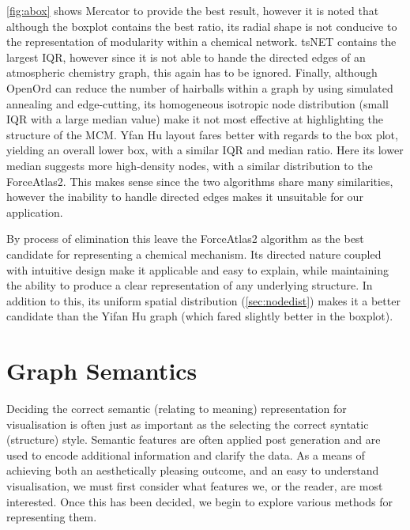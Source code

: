 \autoref{fig:abox} shows Mercator to provide the best result, however it is noted that although the boxplot contains the best ratio, its radial shape is not conducive to the representation of modularity within a chemical network. tsNET contains the largest IQR, however since it is not able to hande the directed edges of an atmospheric chemistry graph, this again has to be ignored. Finally, although OpenOrd can reduce the number of hairballs within a graph by using simulated annealing and edge-cutting, its homogeneous isotropic node distribution (small IQR with a large median value) make it not most effective at highlighting the  structure of the MCM.  Yfan Hu layout fares better with regards to the box plot, yielding an overall lower box, with a similar IQR and median ratio. Here its lower median suggests more high-density nodes, with a similar distribution to the ForceAtlas2. This makes sense since the two algorithms share many similarities, however the inability to handle directed edges makes it unsuitable for our application. 

By process of elimination this leave the ForceAtlas2 algorithm as the best candidate for representing a chemical mechanism. Its directed nature coupled with intuitive design make it applicable and easy to explain, while maintaining the ability to produce a clear representation of any underlying structure. In addition to this, its uniform spatial distribution (\autoref{sec:nodedist}) makes it a better candidate than the Yifan Hu graph (which fared slightly better in the boxplot). 









\section{Graph Semantics}\label{semantic}

Deciding the correct semantic (relating to meaning) representation for visualisation is often just as important as the selecting the correct syntatic (structure) style. Semantic features are often applied post generation \citep{aestheticsgraphvis} and are used to encode additional information and clarify the data. As a means of achieving both an aesthetically pleasing outcome, and an easy to understand visualisation, we must first consider what features we, or the reader, are most interested. Once this has been decided, we begin to explore various methods for representing them. 

